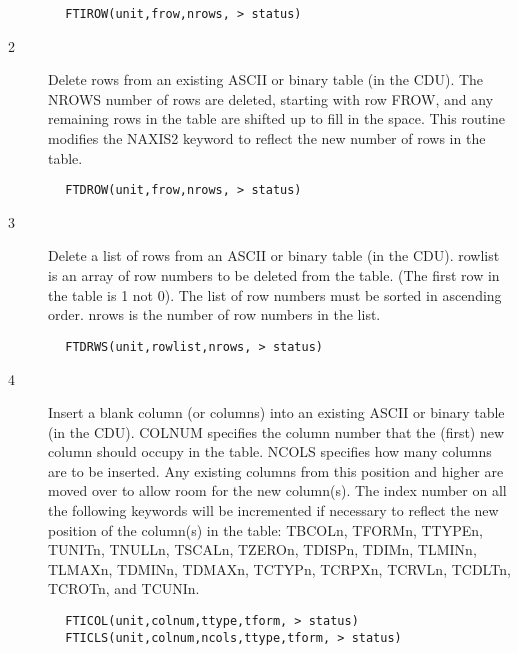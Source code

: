 \documentclass[11pt]{book}
\begin{document}
\begin{verbatim}
        FTIROW(unit,frow,nrows, > status)
\end{verbatim}

\begin{description}
\item[2 ] Delete rows from an existing ASCII or binary table (in the CDU).
    The NROWS number of rows are deleted, starting with row FROW, and
    any remaining rows in the table are shifted up to fill in the space.
    This routine modifies the NAXIS2 keyword to reflect the new number
   of rows in the table.
\end{description}

\begin{verbatim}
        FTDROW(unit,frow,nrows, > status)
\end{verbatim}

\begin{description}
\item[3 ] Delete a list of rows from an ASCII or binary table (in the CDU).
    rowlist is an array of row numbers to be deleted from the table.
    (The first row in the table is 1 not 0).  The list of
    row numbers must be sorted in ascending order.  nrows is the
   number of row numbers in the list.
\end{description}

\begin{verbatim}
        FTDRWS(unit,rowlist,nrows, > status)
\end{verbatim}

\begin{description}
\item[4 ] Insert a blank column (or columns) into an existing ASCII or binary
    table (in the CDU).  COLNUM specifies the column number that the (first)
    new column should occupy in the table.  NCOLS specifies how many
    columns are to be inserted. Any existing columns from this position and
    higher are moved over to allow room for the new column(s).
    The index number on all the following keywords will be incremented
    if necessary to reflect the new position of the column(s) in the table:
    TBCOLn, TFORMn, TTYPEn, TUNITn, TNULLn, TSCALn, TZEROn, TDISPn, TDIMn,
    TLMINn, TLMAXn, TDMINn, TDMAXn, TCTYPn, TCRPXn, TCRVLn, TCDLTn, TCROTn,
   and TCUNIn.
\end{description}

\begin{verbatim}
        FTICOL(unit,colnum,ttype,tform, > status)
        FTICLS(unit,colnum,ncols,ttype,tform, > status)
\end{verbatim}
\end{document}
